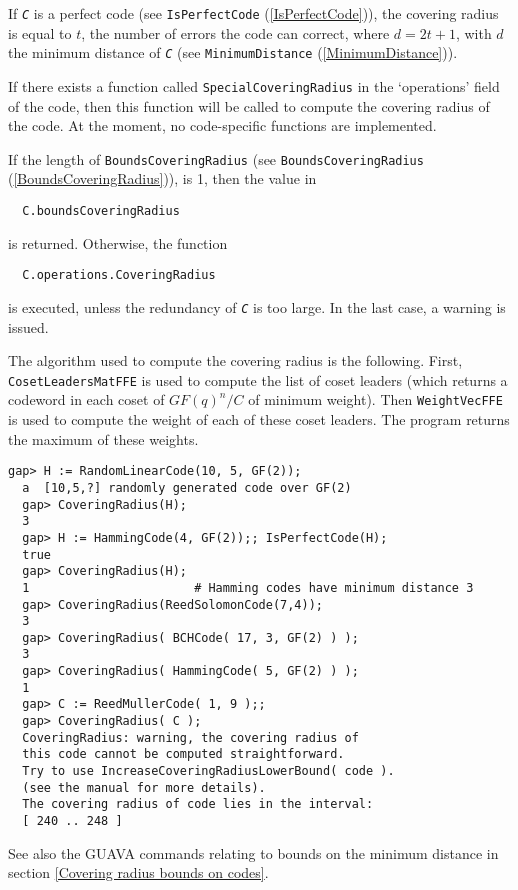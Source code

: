 \documentclass[a4paper,11pt]{report}
\begin{document}
{{{ If \mbox{\texttt{\slshape C}} is a perfect code (see \texttt{IsPerfectCode} (\ref{IsPerfectCode})), the covering radius is equal to $t$, the number of errors the code can correct, where $d = 2t+1$, with $d$ the minimum distance of \mbox{\texttt{\slshape C}} (see \texttt{MinimumDistance} (\ref{MinimumDistance})). 

 If there exists a function called \texttt{SpecialCoveringRadius} in the `operations' field of the code, then this function will be called to
compute the covering radius of the code. At the moment, no code-specific
functions are implemented. 

 If the length of \texttt{BoundsCoveringRadius} (see \texttt{BoundsCoveringRadius} (\ref{BoundsCoveringRadius})), is 1, then the value in 
\begin{verbatim}  
  C.boundsCoveringRadius
\end{verbatim}
 is returned. Otherwise, the function 
\begin{verbatim}  
  C.operations.CoveringRadius
\end{verbatim}
 is executed, unless the redundancy of \mbox{\texttt{\slshape C}} is too large. In the last case, a warning is issued. 

 The algorithm used to compute the covering radius is the following. First, \texttt{CosetLeadersMatFFE} is used to compute the list of coset leaders (which returns a codeword in each
coset of $GF(q)^n/C$ of minimum weight). Then \texttt{WeightVecFFE} is used to compute the weight of each of these coset leaders. The program
returns the maximum of these weights.  }

 
\begin{Verbatim}[fontsize=\small,frame=single,label=Example]
  gap> H := RandomLinearCode(10, 5, GF(2));
  a  [10,5,?] randomly generated code over GF(2)
  gap> CoveringRadius(H);
  3
  gap> H := HammingCode(4, GF(2));; IsPerfectCode(H);
  true
  gap> CoveringRadius(H);
  1                       # Hamming codes have minimum distance 3
  gap> CoveringRadius(ReedSolomonCode(7,4));
  3 
  gap> CoveringRadius( BCHCode( 17, 3, GF(2) ) );
  3
  gap> CoveringRadius( HammingCode( 5, GF(2) ) );
  1
  gap> C := ReedMullerCode( 1, 9 );;
  gap> CoveringRadius( C );
  CoveringRadius: warning, the covering radius of
  this code cannot be computed straightforward.
  Try to use IncreaseCoveringRadiusLowerBound( code ).
  (see the manual for more details).
  The covering radius of code lies in the interval:
  [ 240 .. 248 ]
\end{Verbatim}
  See also the \textsf{GUAVA} commands relating to bounds on the minimum distance in section \ref{Covering radius bounds on codes}. 

}}
\end{document}
